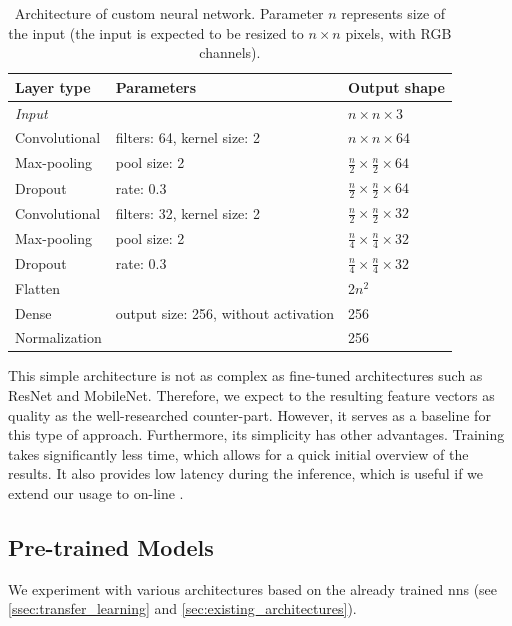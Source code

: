 \begin{table}
    \centering
    \begin{tabular}{l|l|l}
         Layer type & Parameters & Output shape \\ \hline
         \emph{Input} & & $n \times n \times 3$ \\
         Convolutional & filters: 64, kernel size: 2 & $n \times n \times 64$ \\
         Max-pooling & pool size: 2 & $\frac{n}{2} \times \frac{n}{2} \times 64$ \\
         Dropout & rate: 0.3 & $\frac{n}{2} \times \frac{n}{2} \times 64$ \\
         Convolutional & filters: 32, kernel size: 2 & $\frac{n}{2} \times \frac{n}{2} \times 32$ \\
         Max-pooling & pool size: 2 & $\frac{n}{4} \times \frac{n}{4} \times 32$ \\
         Dropout & rate: 0.3 & $\frac{n}{4} \times \frac{n}{4} \times 32$ \\
         Flatten & & 2$n^2$ \\
         Dense & output size: 256, without activation & 256 \\
         Normalization & & 256
    \end{tabular}
    \caption[Architecture of custom neural network]{Architecture of custom neural network. Parameter $n$ represents size of the input (the input is expected to be resized to $n\times n$ pixels, with RGB channels).}
    \label{tab:custom_architecture}
\end{table}

This simple architecture is not as complex as fine-tuned architectures such as ResNet and MobileNet. Therefore, we expect to the resulting feature vectors as quality as the well-researched counter-part. However, it serves as a baseline for this type of approach. Furthermore, its simplicity has other advantages. Training takes significantly less time, which allows for a quick initial overview of the results. It also provides low latency during the inference, which is useful if we extend our usage to on-line \reid{}.

\subsection{Pre-trained Models}

We experiment with various architectures based on the already trained \glspl{nn} (see \autoref{ssec:transfer_learning} and \autoref{sec:existing_architectures}).


